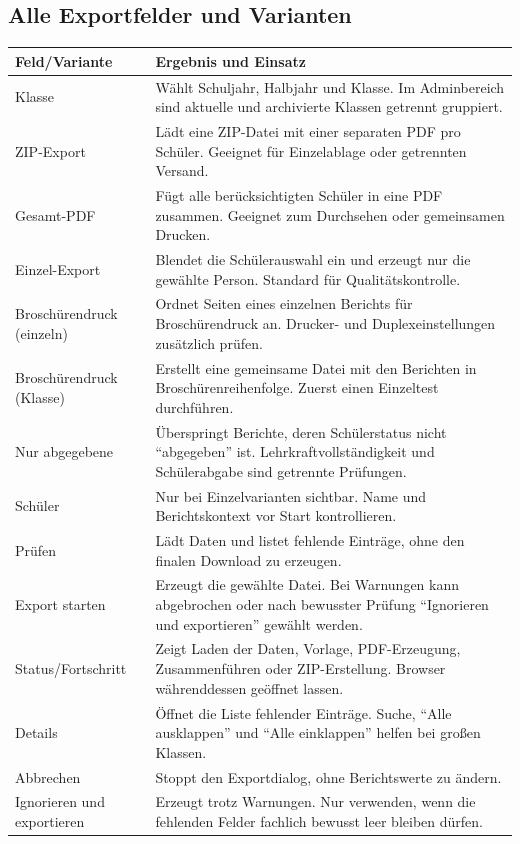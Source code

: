 \documentclass[12pt,a4paper]{article}
\begin{document}
\subsection{Alle Exportfelder und Varianten}
\small
\begin{longtable}{|p{}|p{}|}
\hline
\textbf{Feld/Variante} & \textbf{Ergebnis und Einsatz}\\
\hline
Klasse & Wählt Schuljahr, Halbjahr und Klasse. Im Adminbereich sind aktuelle und archivierte Klassen getrennt gruppiert.\\
\hline
ZIP-Export & Lädt eine ZIP-Datei mit einer separaten PDF pro Schüler. Geeignet für Einzelablage oder getrennten Versand.\\
\hline
Gesamt-PDF & Fügt alle berücksichtigten Schüler in eine PDF zusammen. Geeignet zum Durchsehen oder gemeinsamen Drucken.\\
\hline
Einzel-Export & Blendet die Schülerauswahl ein und erzeugt nur die gewählte Person. Standard für Qualitätskontrolle.\\
\hline
Broschürendruck (einzeln) & Ordnet Seiten eines einzelnen Berichts für Broschürendruck an. Drucker- und Duplexeinstellungen zusätzlich prüfen.\\
\hline
Broschürendruck (Klasse) & Erstellt eine gemeinsame Datei mit den Berichten in Broschürenreihenfolge. Zuerst einen Einzeltest durchführen.\\
\hline
Nur abgegebene & Überspringt Berichte, deren Schülerstatus nicht \enquote{abgegeben} ist. Lehrkraftvollständigkeit und Schülerabgabe sind getrennte Prüfungen.\\
\hline
Schüler & Nur bei Einzelvarianten sichtbar. Name und Berichtskontext vor Start kontrollieren.\\
\hline
Prüfen & Lädt Daten und listet fehlende Einträge, ohne den finalen Download zu erzeugen.\\
\hline
Export starten & Erzeugt die gewählte Datei. Bei Warnungen kann abgebrochen oder nach bewusster Prüfung \enquote{Ignorieren und exportieren} gewählt werden.\\
\hline
Status/Fortschritt & Zeigt Laden der Daten, Vorlage, PDF-Erzeugung, Zusammenführen oder ZIP-Erstellung. Browser währenddessen geöffnet lassen.\\
\hline
Details & Öffnet die Liste fehlender Einträge. Suche, \enquote{Alle ausklappen} und \enquote{Alle einklappen} helfen bei großen Klassen.\\
\hline
Abbrechen & Stoppt den Exportdialog, ohne Berichtswerte zu ändern.\\
\hline
Ignorieren und exportieren & Erzeugt trotz Warnungen. Nur verwenden, wenn die fehlenden Felder fachlich bewusst leer bleiben dürfen.\\
\hline
\end{longtable}
\normalsize
\end{document}
